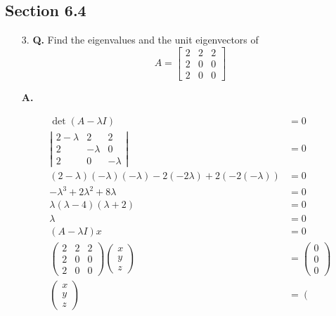 \documentclass[main.tex]{subfiles}
\begin{document}
\subsection{Section 6.4}
\begin{enumerate}
    \item [3.] \textbf{Q.} Find the eigenvalues and the unit eigenvectors of
    $$
    A=\left[\begin{array}{lll}
    2 & 2 & 2 \\
    2 & 0 & 0 \\
    2 & 0 & 0
    \end{array}\right]
    $$
    
    \textbf{A.}

    $$
    \begin{aligned}
    \operatorname{det}(A-\lambda I) &=0 \\
    \left|\begin{array}{ccc}
    2-\lambda & 2 & 2 \\
    2 & -\lambda & 0 \\
    2 & 0 & -\lambda
    \end{array}\right| &=0 \\
    (2-\lambda)(-\lambda)(-\lambda)-2(-2 \lambda)+2(-2(-\lambda)) &=0 \\
    -\lambda^{3}+2 \lambda^{2}+8 \lambda &=0 \\
    \lambda(\lambda-4)(\lambda+2)&=0 \\
    \lambda &= 0\\
    (A-\lambda I) x &= 0\\
    \left(\begin{array}{lll}
    2 & 2 & 2 \\
    2 & 0 & 0 \\
    2 & 0 & 0
    \end{array}\right)\left(\begin{array}{l}
    x \\
    y \\
    z
    \end{array}\right) &=\left(\begin{array}{l}
    0 \\
    0 \\
    0
    \end{array}\right) \\
    \left(\begin{array}{l}
    x \\
    y \\
    z
    \end{array}\right) &=\left(\begin{array}{l}

\end{array}
\end{aligned}$$
\end{enumerate}
\end{document}
